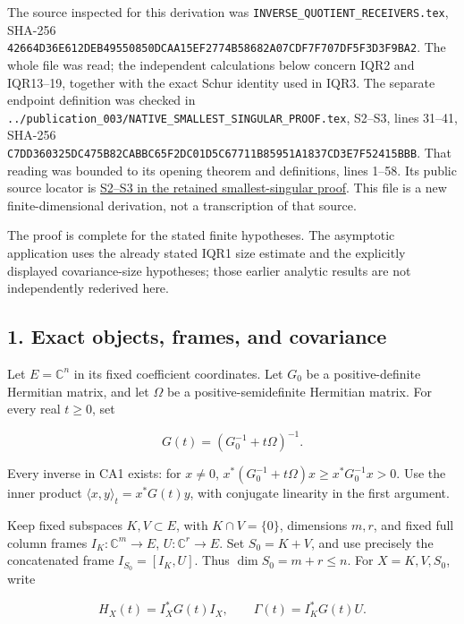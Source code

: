 \documentclass[11pt]{article}
\begin{document}
The source inspected for this derivation was \nolinkurl{INVERSE_QUOTIENT_RECEIVERS.tex}, SHA-256 \nolinkurl{42664D36E612DEB49550850DCAA15EF2774B58682A07CDF7F707DF5F3D3F9BA2}. The whole file was read; the independent calculations below concern IQR2 and IQR13--19, together with the exact Schur identity used in IQR3. The separate endpoint definition was checked in \nolinkurl{../publication_003/NATIVE_SMALLEST_SINGULAR_PROOF.tex}, S2--S3, lines 31--41, SHA-256 \nolinkurl{C7DD360325DC475B82CABBC65F2DC01D5C67711B85951A1837CD3E7F52415BBB}. That reading was bounded to its opening theorem and definitions, lines 1--58. Its public source locator is \href{https://github.com/KokunoYumeto/zeta-function-research-reader/blob/0fd693c844aad9117e30ec447c59864a28af10f3/workbenches/splitzero-tandem/continuations/20260921-native-spectral-real-pair/003/NATIVE_SMALLEST_SINGULAR_PROOF.tex\#L31}{S2--S3 in the retained smallest-singular proof}. This file is a new finite-dimensional derivation, not a transcription of that source.

The proof is complete for the stated finite hypotheses. The asymptotic application uses the already stated IQR1 size estimate and the explicitly displayed covariance-size hypotheses; those earlier analytic results are not independently rederived here.

\subsection{1. Exact objects, frames, and covariance}\label{exact-objects-frames-and-covariance}

Let \(E=\mathbb C^n\) in its fixed coefficient coordinates. Let \(G_0\) be a positive-definite Hermitian matrix, and let \(\Omega\) be a positive-semidefinite Hermitian matrix. For every real \(t\ge0\), set

\[
G(t)=(G_0^{-1}+t\Omega)^{-1}.
\tag{CA1}
\]

Every inverse in CA1 exists: for \(x\ne0\), \(x^*(G_0^{-1}+t\Omega)x\ge x^*G_0^{-1}x>0\). Use the inner product \(\langle x,y\rangle_t=x^*G(t)y\), with conjugate linearity in the first argument.

Keep fixed subspaces \(K,V\subset E\), with \(K\cap V=\{0\}\), dimensions \(m,r\), and fixed full column frames \(I_K:\mathbb C^m\to E\), \(U:\mathbb C^r\to E\). Set \(S_0=K+V\), and use precisely the concatenated frame \(I_{S_0}=[I_K,U]\). Thus \(\dim S_0=m+r\le n\). For \(X=K,V,S_0\), write

\[
H_X(t)=I_X^*G(t)I_X,
\qquad
\Gamma(t)=I_K^*G(t)U.
\tag{CA2}
\]
\end{document}
